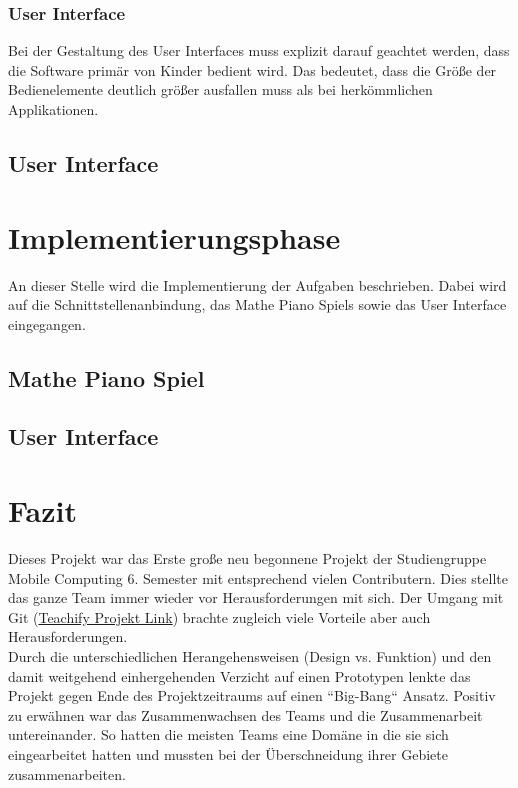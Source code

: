 \subsubsection{User Interface}
Bei der Gestaltung des User Interfaces muss explizit darauf geachtet werden, dass die Software primär von Kinder bedient wird. Das bedeutet, dass die Größe der Bedienelemente deutlich größer ausfallen muss als bei herkömmlichen Applikationen.   

\subsection{User Interface}

\section{Implementierungsphase}
An dieser Stelle wird die Implementierung der Aufgaben beschrieben. Dabei wird auf die Schnittstellenanbindung, das Mathe Piano Spiels sowie das User Interface eingegangen.
\subsection{Mathe Piano Spiel}


\subsection{User Interface}


\section{Fazit}
Dieses Projekt war das Erste große neu begonnene Projekt der Studiengruppe Mobile Computing 6. Semester mit entsprechend vielen Contributern. Dies stellte das ganze Team immer wieder vor Herausforderungen mit sich. Der Umgang mit Git (\href{https://github.com/cpfeiffer3008/Teachify}{Teachify Projekt Link}) brachte zugleich viele Vorteile aber auch Herausforderungen.\\
Durch die unterschiedlichen Herangehensweisen (Design vs. Funktion) und den damit weitgehend einhergehenden Verzicht auf einen Prototypen lenkte das Projekt gegen Ende des Projektzeitraums auf einen ``Big-Bang`` Ansatz.
Positiv zu erwähnen war das Zusammenwachsen des Teams und die Zusammenarbeit untereinander. So hatten die meisten Teams eine Domäne in die sie sich eingearbeitet hatten und mussten bei der Überschneidung ihrer Gebiete zusammenarbeiten.